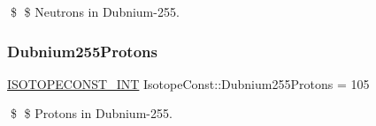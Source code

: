 \$ \$ Neutrons in Dubnium-\/255. \mbox{\label{group___isotope_const-_dubnium-_db255_ga660df72a242becc70e20d71b0749aafc}} 
\subsubsection{\texorpdfstring{Dubnium255\+Protons}{Dubnium255Protons}}
{\footnotesize\ttfamily \mbox{\hyperlink{group___isotope_const-_macros_ga5f18360b3e99483a35c32d789e62621c}{I\+S\+O\+T\+O\+P\+E\+C\+O\+N\+S\+T\+\_\+\+I\+NT}} Isotope\+Const\+::\+Dubnium255\+Protons = 105}

\$ \$ Protons in Dubnium-\/255. 